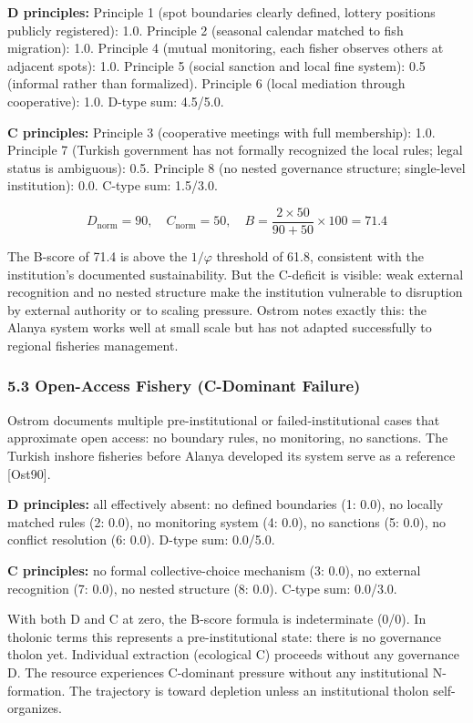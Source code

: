 \documentclass[
  11pt,
  letterpaper,
]{article}
\begin{document}
\textbf{D principles:} Principle 1 (spot boundaries clearly defined,
lottery positions publicly registered): 1.0. Principle 2 (seasonal
calendar matched to fish migration): 1.0. Principle 4 (mutual
monitoring, each fisher observes others at adjacent spots): 1.0.
Principle 5 (social sanction and local fine system): 0.5 (informal
rather than formalized). Principle 6 (local mediation through
cooperative): 1.0. D-type sum: 4.5/5.0.

\textbf{C principles:} Principle 3 (cooperative meetings with full
membership): 1.0. Principle 7 (Turkish government has not formally
recognized the local rules; legal status is ambiguous): 0.5. Principle 8
(no nested governance structure; single-level institution): 0.0. C-type
sum: 1.5/3.0.

\[D_{\text{norm}} = 90, \quad C_{\text{norm}} = 50, \quad B = \frac{2 \times 50}{90 + 50} \times 100 = 71.4\]

The B-score of 71.4 is above the \(1/\varphi\) threshold of 61.8,
consistent with the institution's documented sustainability. But the
C-deficit is visible: weak external recognition and no nested structure
make the institution vulnerable to disruption by external authority or
to scaling pressure. Ostrom notes exactly this: the Alanya system works
well at small scale but has not adapted successfully to regional
fisheries management.

\subsubsection{5.3 Open-Access Fishery (C-Dominant
Failure)}\label{open-access-fishery-c-dominant-failure}

Ostrom documents multiple pre-institutional or failed-institutional
cases that approximate open access: no boundary rules, no monitoring, no
sanctions. The Turkish inshore fisheries before Alanya developed its
system serve as a reference {[}Ost90{]}.

\textbf{D principles:} all effectively absent: no defined boundaries (1:
0.0), no locally matched rules (2: 0.0), no monitoring system (4: 0.0),
no sanctions (5: 0.0), no conflict resolution (6: 0.0). D-type sum:
0.0/5.0.

\textbf{C principles:} no formal collective-choice mechanism (3: 0.0),
no external recognition (7: 0.0), no nested structure (8: 0.0). C-type
sum: 0.0/3.0.

With both D and C at zero, the B-score formula is indeterminate (0/0).
In tholonic terms this represents a pre-institutional state: there is no
governance tholon yet. Individual extraction (ecological C) proceeds
without any governance D. The resource experiences C-dominant pressure
without any institutional N-formation. The trajectory is toward
depletion unless an institutional tholon self-organizes.
\end{document}
